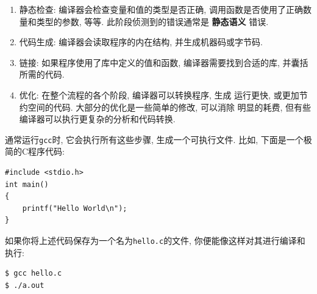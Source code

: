 \documentclass[12pt]{book}
\begin{document}
{\begin{enumerate}
\item 静态检查: 编译器会检查变量和值的类型是否正确, 
  调用函数是否使用了正确数量和类型的参数, 等等.
  此阶段侦测到的错误通常是 {\bf 静态语义} 错误.

\item 代码生成: 编译器会读取程序的内在结构, 
  并生成机器码或字节码.

\item 链接: 如果程序使用了库中定义的值和函数, 
  编译器需要找到合适的库, 并囊括所需的代码.

\item 优化: 在整个流程的各个阶段, 编译器可以转换程序, 生成
  运行更快, 或更加节约空间的代码. 大部分的优化是一些简单的修改, 可以消除
  明显的耗费, 但有些编译器可以执行更复杂的分析和代码转换.

\end{enumerate}
通常运行{\tt gcc}时, 它会执行所有这些步骤, 生成一个可执行文件.
比如, 下面是一个极简的C程序代码:

\begin{verbatim}
#include <stdio.h>
int main()
{
    printf("Hello World\n");
}
\end{verbatim}
如果你将上述代码保存为一个名为{\tt hello.c}的文件, 
你便能像这样对其进行编译和执行:

\begin{verbatim}
$ gcc hello.c
$ ./a.out
\end{verbatim}

}
\end{document}
